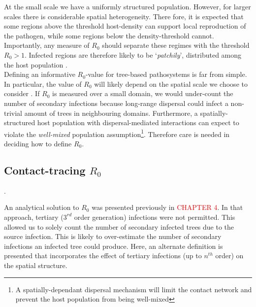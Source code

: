 At the small scale we have a uniformly structured population. %
However, for larger scales there is considerable spatial heterogeneity. %
There fore, it is expected that some regions above the threshold host-density can support %
local reproduction of the pathogen, while some regions below the density-threshold cannot. %
Importantly, any measure of $R_0$ should separate these regimes with the threshold $R_0>1$. %
Infected regions are therefore likely to be `\textit{patchily}', distributed among the host %
population \cite{park2001invasion}.\\

Defining an informative $R_0$-value for tree-based pathosystems is far from simple. %
In particular, the value of $R_0$ will likely depend on the spatial scale we choose to %
consider \cite{mikaberidze2016invasiveness}. %
If  $R_0$ is measured over a small domain, we would under-count the number of secondary %
infections because long-range dispersal could infect a non-trivial amount of trees in %
neighbouring domains. %
Furthermore, a spatially-structured host population with dispersal-mediated interactions %
can expect to violate the \textit{well-mixed} population assumption\footnote{A spatially-dependant dispersal mechanism will limit the contact network and prevent the host population from being well-mixed}. 
Therefore care is needed in deciding how to define $R_0$.\\

\label{ch5:dispersal-model}


\subsection{Contact-tracing $R_0$}. %

An analytical solution to $R_0$ was presented previously in \textcolor{red}{CHAPTER 4}. %
In that approach, tertiary ($3^{rd}$ order generation) infections were not permitted. %
This allowed us to solely count the number of secondary infected trees due to the source infection. %
This is likely to over-estimate the number of secondary infections an infected tree could produce. %
Here, an alternate definition is presented that incorporates the effect of tertiary infections %
(up to $n^{th}$ order)  on the spatial structure.\\

